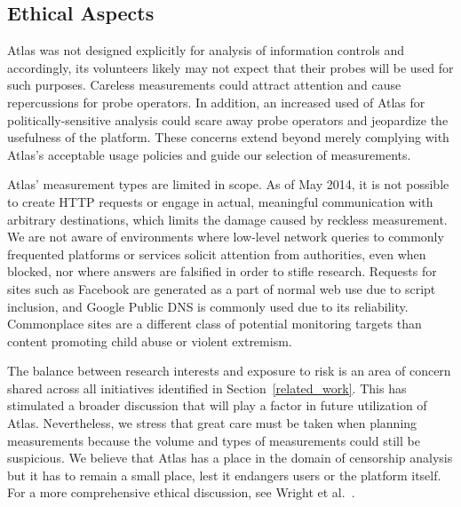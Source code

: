 \subsection{Ethical Aspects}

Atlas was not designed explicitly for analysis of information controls
and accordingly, its volunteers likely may not expect that their probes
will be used for such purposes.  Careless measurements could attract
attention and cause repercussions for probe operators.  In addition, an
increased used of Atlas for politically-sensitive analysis could scare
away probe operators and jeopardize the usefulness of the platform.
These concerns extend beyond merely complying with Atlas's acceptable
usage policies and guide our selection of measurements.

Atlas' measurement types are limited in scope.  As of May 2014, it is
not possible to create HTTP requests or engage in actual, meaningful
communication with arbitrary destinations, which limits the damage
caused by reckless measurement. We are not aware of environments where
low-level network queries to commonly frequented platforms or services
solicit attention from authorities, even when blocked, nor where answers
are falsified in order to stifle research. Requests for sites such as
Facebook are generated as a part of normal web use due to script
inclusion, and Google Public DNS is commonly used due to its
reliability. Commonplace sites are a different class of potential
monitoring targets than content promoting child abuse or violent
extremism.

The balance between research interests and exposure to risk is an area
of concern shared across all initiatives identified in
Section~\ref{related_work}. This has stimulated a broader discussion
that will play a factor in future utilization of Atlas. Nevertheless, we
stress that great care must be taken when planning measurements because
the volume and types of measurements could still be suspicious. We
believe that Atlas has a place in the domain of censorship analysis but
it has to remain a small place, lest it endangers users or the platform
itself. For a more comprehensive ethical discussion, see Wright et
al.~\cite[\S~5]{Wright2011}.

